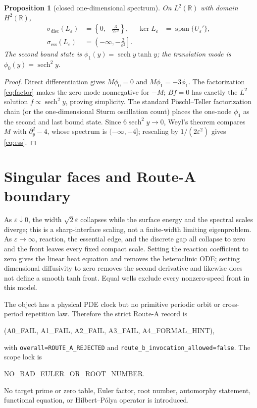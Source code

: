 \documentclass[10pt]{article}
\newtheorem{proposition}[theorem]{Proposition}
\newcommand{\sech}{\operatorname{sech}}
\newcommand{\eps}{\varepsilon}
\begin{document}
\begin{proposition}[closed one-dimensional spectrum]\label{prop:spectrum}
On $L^2(\mathbb R)$ with domain $H^2(\mathbb R)$,
\begin{align}
 \sigma_{\mathrm{disc}}(L_\eps)&=\left\{0,-\frac3{2\eps^2}\right\},
 &\ker L_\eps&=\operatorname{span}\{U_\eps'\},
 \label{eq:disc}\\
 \sigma_{\mathrm{ess}}(L_\eps)&=\left(-\infty,-\frac2{\eps^2}\right].
 \label{eq:ess}
\end{align}
The second bound state is $\phi_1(y)=\sech y\tanh y$; the translation mode
is $\phi_0(y)=\sech^2y$.
\end{proposition}

\begin{proof}
Direct differentiation gives $M\phi_0=0$ and $M\phi_1=-3\phi_1$.  The
factorization \eqref{eq:factor} makes the zero mode nonnegative for $-M$;
$Bf=0$ has exactly the $L^2$ solution $f\propto\sech^2y$, proving simplicity.
The standard Pöschl--Teller factorization chain (or the one-dimensional Sturm
oscillation count) places the one-node $\phi_1$ as the second and last bound
state.  Since $6\sech^2y\to0$, Weyl's theorem compares $M$ with
$\partial_y^2-4$, whose spectrum is $(-\infty,-4]$; rescaling by
$1/(2\eps^2)$ gives \eqref{eq:ess}.
\end{proof}

\section{Singular faces and Route-A boundary}
As $\eps\downarrow0$, the width $\sqrt2\eps$ collapses while the surface
energy and the spectral scales diverge; this is a sharp-interface scaling, not
a finite-width limiting eigenproblem.  As $\eps\to\infty$, reaction, the
essential edge, and the discrete gap all collapse to zero and the front leaves
every fixed compact scale.  Setting the reaction coefficient to zero gives the
linear heat equation and removes the heteroclinic ODE; setting dimensional
diffusivity to zero removes the second derivative and likewise does not define
a smooth tanh front.  Equal wells exclude every nonzero-speed front in this
model.

The object has a physical PDE clock but no primitive periodic orbit or
cross-period repetition law.  Therefore the strict Route-A record is
\begin{center}\ttfamily
(A0\_FAIL, A1\_FAIL, A2\_FAIL, A3\_FAIL, A4\_FORMAL\_HINT),
\end{center}
with \texttt{overall=ROUTE\_A\_REJECTED} and
\texttt{route\_b\_invocation\_allowed=false}.  The scope lock is
\begin{center}\ttfamily NO\_BAD\_EULER\_OR\_ROOT\_NUMBER.\end{center}
No target prime or zero table, Euler factor, root number, automorphy statement,
functional equation, or Hilbert--Pólya operator is introduced.
\fi
\end{document}
